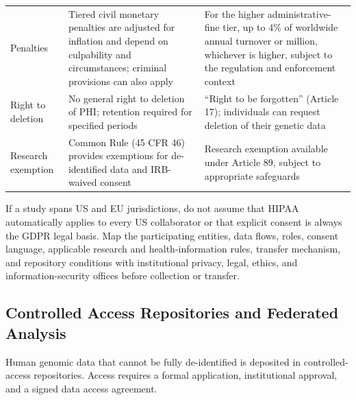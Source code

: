 \begin{table}[htbp]
\begin{tabularx}{\textwidth}{@{}l X X@{}}
\addlinespace
Penalties & Tiered civil monetary penalties are adjusted for inflation and depend on culpability and circumstances; criminal provisions can also apply & For the higher administrative-fine tier, up to 4\% of worldwide annual turnover or \texteuro 20 million, whichever is higher, subject to the regulation and enforcement context \\
\addlinespace
Right to deletion & No general right to deletion of PHI; retention required for specified periods & ``Right to be forgotten'' (Article 17); individuals can request deletion of their genetic data \\
\addlinespace
Research exemption & Common Rule (45 CFR 46) provides exemptions for de-identified data and IRB-waived consent & Research exemption available under Article 89, subject to appropriate safeguards \\
\bottomrule
\end{tabularx}
\end{table}

\begin{tipbox}[title={Practical Implications for Genomics Researchers}]
If a study spans US and EU jurisdictions, do not assume that HIPAA automatically applies to every US collaborator or that explicit consent is always the GDPR legal basis. Map the participating entities, data flows, roles, consent language, applicable research and health-information rules, transfer mechanism, and repository conditions with institutional privacy, legal, ethics, and information-security offices before collection or transfer.
\end{tipbox}

\subsection{Controlled Access Repositories and Federated Analysis}
\label{subsec:datastandards:controlledaccess}

Human genomic data that cannot be fully de-identified is deposited in controlled-access repositories. Access requires a formal application, institutional approval, and a signed data access agreement.

